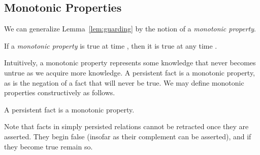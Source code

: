 \subsection{Monotonic Properties}


We can generalize Lemma~\ref{lem:guarding} by the notion of a {\em monotonic property}.

\begin{definition}
If a {\em monotonic property} is true at time , then it is true at any time .
\end{definition}

Intuitively, a monotonic property represents some knowledge that never becomes untrue as we acquire  more knowledge.  A persistent fact is a monotonic property, as is the negation of a
fact that will never be true.  We may define monotonic properties constructively as follows.



\begin{definition}
A persistent fact is a monotonic property.   
\end{definition}

Note that facts in simply persisted relations cannot be retracted once they are asserted.  They begin false
(insofar as their complement can be asserted), and if they become true remain so.

